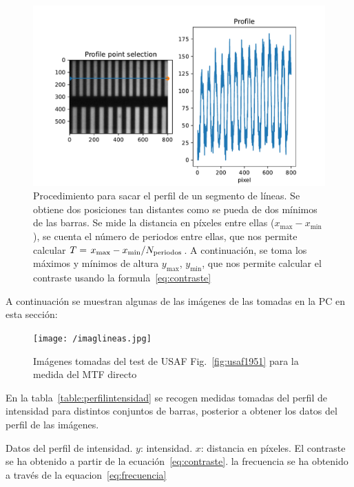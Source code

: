 \documentclass{./packages/optica-article}
\begin{document}
\begin{figure}[!h]
	\includegraphics[width=\textwidth]{profile-lines.pdf}
	\caption{Procedimiento para sacar el perfil de un segmento de líneas. Se obtiene dos posiciones tan distantes como se pueda de dos mínimos de las barras. Se mide la distancia en píxeles entre ellas ($x_{\max} - x_{\min} $), se cuenta el número de periodos entre ellas, que nos permite calcular $T = \flatfrac{x_{\max} - x_{\min} }{N_{\textrm{periodos}}}$. A continuación,  se toma los máximos y mínimos de altura $y_{\max}$, $y_{\min}$, que nos permite calcular el contraste usando la formula~\ref{eq:contraste} }\label{fig:perfil:example}
\end{figure}

A continuación se muestran algunas de las imágenes de las tomadas en la PC en esta sección:

\begin{figure}[!h]
	\texttt{[image: /imaglineas.jpg]}
	\caption{Imágenes tomadas del test de USAF Fig.~\ref{fig:usaf1951} para la medida del MTF directo}\label{fig:images:example}
\end{figure}


En la tabla~\ref{table:perfilintensidad} se recogen medidas tomadas del perfil de intensidad para distintos conjuntos de barras, posterior a obtener los datos del perfil de las imágenes.

\begin{table}[p]
	\centering
	\caption{Datos del perfil de intensidad. $y$: intensidad. $x$: distancia en píxeles. El contraste se ha obtenido a partir de la ecuación~\ref{eq:contraste}.
		la frecuencia se ha obtenido a través de la equacion~\ref{eq:frecuencia}}%
	\label{table:perfilintensidad}
\end{table}
\end{document}
